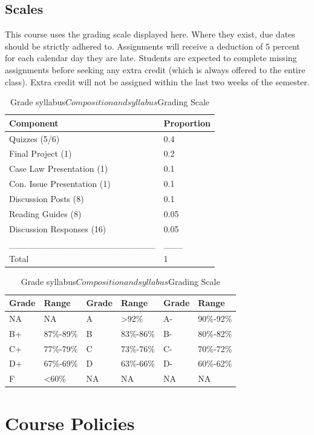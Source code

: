\documentclass[10pt,]{article}
\begin{document}
\hypertarget{scales}{%
\subsection{Scales}\label{scales}}

This course uses the grading scale displayed here. Where they exist, due
dates should be strictly adhered to. Assignments will receive a
deduction of 5 percent for each calendar day they are late. Students are
expected to complete missing assignments before seeking any extra credit
(which is always offered to the entire class). Extra credit will not be
assigned within the last two weeks of the semester.

\begin{table}[!h]
\caption{\label{tab:unnamed-chunk-2}Grade syllabus$Composition and syllabus$Grading Scale}

\centering
\begin{tabular}[t]{ll}
\toprule
Component & Proportion\\
\midrule
Quizzes (5/6) & 0.4\\
Final Project (1) & 0.2\\
Case Law Presentation (1) & 0.1\\
Con. Issue Presentation (1) & 0.1\\
Discussion Posts (8) & 0.1\\
\addlinespace
Reading Guides (8) & 0.05\\
Discussion Responses (16) & 0.05\\
\_\_\_\_\_\_\_\_\_\_\_\_\_\_\_\_\_\_\_\_\_\_\_ & \_\_\_\\
Total & 1\\
\bottomrule
\end{tabular}
\centering
\begin{tabular}[t]{llllll}
\toprule
Grade & Range & Grade & Range & Grade & Range\\
\midrule
NA & NA & A & >92\% & A- & 90\%-92\%\\
B+ & 87\%-89\% & B & 83\%-86\% & B- & 80\%-82\%\\
C+ & 77\%-79\% & C & 73\%-76\% & C- & 70\%-72\%\\
D+ & 67\%-69\% & D & 63\%-66\% & D- & 60\%-62\%\\
F & <60\% & NA & NA & NA & NA\\
\bottomrule
\end{tabular}
\end{table}

\newpage

\hypertarget{course-policies}{%
\section{Course Policies}\label{course-policies}}
\end{document}
